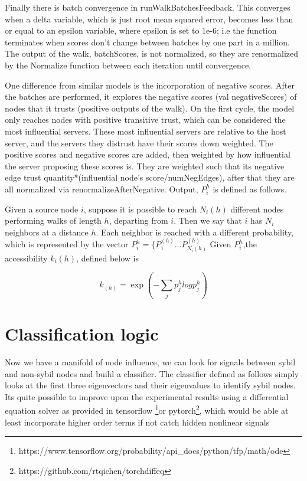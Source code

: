 \documentclass{article}
\begin{document}
Finally there is batch convergence in runWalkBatchesFeedback. This converges when a delta variable, which is just root mean squared error, becomes less than or equal to an epsilon variable, where epsilon is set to 1e-6; i.e the function terminates when scores don’t change between batches by one part in a million. The output of the walk, batchScores, is not normalized, so they are renormalized by the Normalize function between each iteration until convergence.

One difference from similar models is the incorporation of negative scores. After the batches are performed, it explores the negative scores (val negativeScores) of nodes that it trusts (positive outputs of the walk). On the first cycle, the model only reaches nodes with positive transitive trust, which can be considered the most influential servers. These most influential servers are relative to the host server, and the servers they distrust have their scores down weighted. The positive scores and negative scores are added, then weighted by how influential the server proposing these scores is. They are weighted such that its negative edge trust quantity*(influential node’s score/numNegEdges), after that they are all normalized via renormalizeAfterNegative. Output, $P_i^h$ is defined as follows.

Given a source node $i$, suppose it is possible to reach $N_i(h)$ different nodes performing walks of length $h$, departing from $i$. Then we say that $i$ has $N_i$ neighbors at a distance $h$. Each neighbor is reached with a different probability, which is represented by the vector $P_i^h = \{ P_1^{(h)} \dots P_{N_i(h)}^{(h)}$ Given $P_i^h$,the accessibility $k_i(h)$, defined below is 
	
	
\begin{equation}
k_(h) = \exp (-\sum_j p^{h}_j log p^{h}_j )
\end{equation}

\section{Classification logic}
Now we have a manifold of node influence, we can look for signals between sybil and non-sybil nodes and build a classifier. The classifier defined as follows simply looks at the first three eigenvectors and their eigenvalues to identify sybil nodes. Its quite possible to improve upon the experimental results using a differential equation solver as provided in tensorflow \footnote{https://www.tensorflow.org/probability/api_docs/python/tfp/math/ode}or pytorch\footnote{https://github.com/rtqichen/torchdiffeq}, which would be able at least incorporate higher order terms if not catch hidden nonlinear signals
\end{document}
